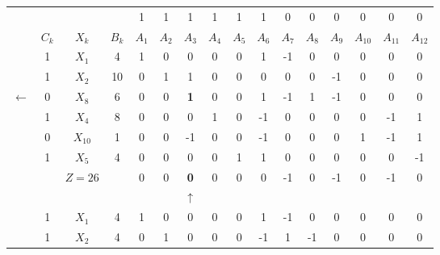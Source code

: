     \begin{tabular}{cccccccccccccccc}
\cline{2-16}            &         &         &         & 1       & 1       & 1       & 1       & 1       & 1       & 0       & 0       & 0       & 0       & 0       & 0 \bigstrut[t]\\
            & $C_k$   & $X_k$   & $B_k$   & $A_1$   & $A_2$   & $A_3$   & $A_4$   & $A_5$   & $A_6$   & $A_7$   & $A_8$   & $A_9$   & $A_{10}$ & $A_{11}$ & $A_{12}$ \bigstrut[b]\\
\cline{2-16}            & 1       & $X_1$   & 4       & 1       & 0       & 0       & 0       & 0       & 1       & -1      & 0       & 0       & 0       & 0       & 0 \bigstrut[t]\\
            & 1       & $X_2$   & 10      & 0       & 1       & 1       & 0       & 0       & 0       & 0       & 0       & -1      & 0       & 0       & 0 \\
    $\leftarrow$ & 0       & \textcolor[rgb]{ 1,  0,  0}{\boldmath{}\textbf{$X_8$}\unboldmath{}} & 6       & 0       & 0       & \textbf{1} & 0       & 0       & 1       & -1      & 1       & -1      & 0       & 0       & 0 \\
            & 1       & $X_4$   & 8       & 0       & 0       & 0       & 1       & 0       & -1      & 0       & 0       & 0       & 0       & -1      & 1 \\
            & 0       & $X_{10}$ & 1       & 0       & 0       & -1      & 0       & 0       & -1      & 0       & 0       & 0       & 1       & -1      & 1 \\
            & 1       & $X_5$   & 4       & 0       & 0       & 0       & 0       & 1       & 1       & 0       & 0       & 0       & 0       & 0       & -1 \bigstrut[b]\\
\cline{2-16}            &         & $Z=26$  &         & 0       & 0       & \textcolor[rgb]{ 0,  .439,  .753}{\textbf{0}} & 0       & 0       & 0       & -1      & 0       & -1      & 0       & -1      & 0 \bigstrut\\
\cline{2-16}            &         &         &         &         &         & $\uparrow$ &         &         &         &         &         &         &         &         &  \bigstrut\\
\cline{2-16}            & 1       & $X_1$   & 4       & 1       & 0       & 0       & 0       & 0       & 1       & -1      & 0       & 0       & 0       & 0       & 0 \bigstrut[t]\\
            & 1       & $X_2$   & 4       & 0       & 1       & 0       & 0       & 0       & -1      & 1       & -1      & 0       & 0       & 0       & 0 \\

\end{tabular}
